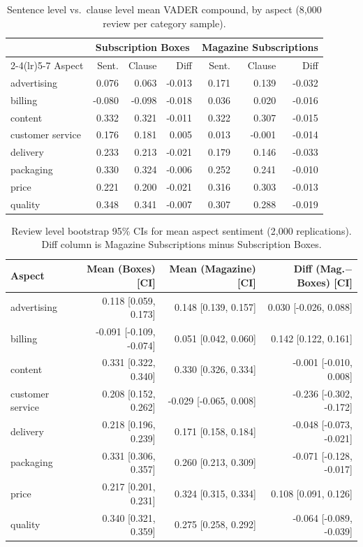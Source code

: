 \documentclass[11pt,a4paper,DIV=12]{scrartcl}
\begin{document}
\begin{table}[H]
\centering
\caption{Sentence level vs.\ clause level mean VADER compound, by aspect (8,000 review per category sample).}
\label{tab:rq2clause}
\setlength{\tabcolsep}{3.5pt}
\scriptsize
\begin{tabular}{lrrr@{\qquad}rrr}
\toprule
& \multicolumn{3}{c}{Subscription Boxes} & \multicolumn{3}{c}{Magazine Subscriptions} \\
\cmidrule(lr){2-4}\cmidrule(lr){5-7}
Aspect & Sent. & Clause & Diff & Sent. & Clause & Diff \\
\midrule
advertising      & 0.076 & 0.063 & -0.013 & 0.171 & 0.139 & -0.032 \\
billing          & -0.080 & -0.098 & -0.018 & 0.036 & 0.020 & -0.016 \\
content          & 0.332 & 0.321 & -0.011 & 0.322 & 0.307 & -0.015 \\
customer service & 0.176 & 0.181 & 0.005 & 0.013 & -0.001 & -0.014 \\
delivery         & 0.233 & 0.213 & -0.021 & 0.179 & 0.146 & -0.033 \\
packaging        & 0.330 & 0.324 & -0.006 & 0.252 & 0.241 & -0.010 \\
price            & 0.221 & 0.200 & -0.021 & 0.316 & 0.303 & -0.013 \\
quality          & 0.348 & 0.341 & -0.007 & 0.307 & 0.288 & -0.019 \\
\bottomrule
\end{tabular}
\end{table}

\begin{table}[H]
\centering
\caption{Review level bootstrap 95\% CIs for mean aspect sentiment (2,000 replications). Diff column is Magazine Subscriptions minus Subscription Boxes.}
\label{tab:rq2bootstrap}
\setlength{\tabcolsep}{3.5pt}
\scriptsize
\begin{tabular}{lrrr}
\toprule
Aspect & Mean (Boxes) [CI] & Mean (Magazine) [CI] & Diff (Mag.$-$Boxes) [CI] \\
\midrule
advertising & 0.118 [0.059, 0.173] & 0.148 [0.139, 0.157] & 0.030 [-0.026, 0.088] \\
billing & -0.091 [-0.109, -0.074] & 0.051 [0.042, 0.060] & 0.142 [0.122, 0.161] \\
content & 0.331 [0.322, 0.340] & 0.330 [0.326, 0.334] & -0.001 [-0.010, 0.008] \\
customer service & 0.208 [0.152, 0.262] & -0.029 [-0.065, 0.008] & -0.236 [-0.302, -0.172] \\
delivery & 0.218 [0.196, 0.239] & 0.171 [0.158, 0.184] & -0.048 [-0.073, -0.021] \\
packaging & 0.331 [0.306, 0.357] & 0.260 [0.213, 0.309] & -0.071 [-0.128, -0.017] \\
price & 0.217 [0.201, 0.231] & 0.324 [0.315, 0.334] & 0.108 [0.091, 0.126] \\
quality & 0.340 [0.321, 0.359] & 0.275 [0.258, 0.292] & -0.064 [-0.089, -0.039] \\
\bottomrule
\end{tabular}
\end{table}
\end{document}

